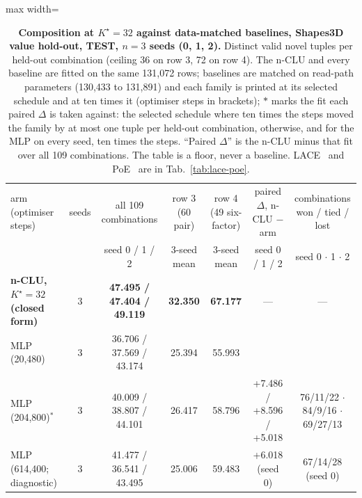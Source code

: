 \documentclass{article} %
\newcommand{\Kstar}{\ensuremath{K^{\star}}}
\begin{document}
\begin{table}[t]
\centering\small
\caption{\textbf{Composition at $\Kstar=32$ against data-matched baselines, Shapes3D value hold-out, TEST, $n=3$
seeds (0, 1, 2).} Distinct valid novel tuples per held-out combination (ceiling 36 on row 3, 72 on row 4). The n-CLU %
and every baseline are fitted on the same 131,072 rows; baselines are matched on read-path parameters %
(130,433 to 131,891) and each family is printed at its selected schedule and at ten times it %
(optimiser steps in brackets); $\ast$ marks the fit each paired $\Delta$ is taken against: the
selected schedule where ten times the steps moved the family by at most one tuple per held-out combination,
otherwise, and for the MLP on every seed, ten times the steps. ``Paired $\Delta$'' is the n-CLU minus
that fit over all 109 combinations. The table is a floor, never a baseline. LACE~\citep{nie_controllable_2021} and PoE~\citep{hinton_training_2002} are in %
Tab.~\ref{tab:lace-poe}.}
\label{tab:t7}
\setlength{\tabcolsep}{3pt}
\begin{adjustbox}{max width=\linewidth}\begin{tabular}{lcccccc}
\toprule
arm (optimiser steps) & seeds & all 109 combinations & row 3 (60 pair) & row 4 (49 six-factor) & paired $\Delta$, n-CLU $-$ arm & combinations won / tied / lost \\ %
 & & seed 0 / 1 / 2 & 3-seed mean & 3-seed mean & seed 0 / 1 / 2 & seed 0 $\cdot$ 1 $\cdot$ 2 \\
\midrule
\textbf{n-CLU, $\Kstar=32$ (closed form)} & 3 & \textbf{47.495 / 47.404 / 49.119} & \textbf{32.350} & \textbf{67.177} & --- & --- \\
MLP (20,480) & 3 & 36.706 / 37.569 / 43.174 & 25.394 & 55.993 & & \\
MLP (204,800)$^\ast$ & 3 & 40.009 / 38.807 / 44.101 & 26.417 & 58.796 & +7.486 / +8.596 / +5.018 & 76/11/22 $\cdot$ 84/9/16 $\cdot$ 69/27/13 \\
MLP (614,400; diagnostic) & 3 & 41.477 / 36.541 / 43.495 & 25.006 & 59.483 & +6.018 (seed 0) & 67/14/28 (seed 0) \\

\end{tabular}
\end{adjustbox}
\end{table}
\end{document}

